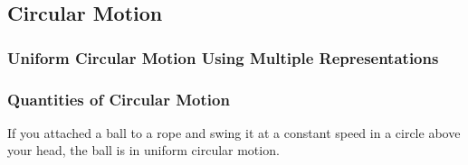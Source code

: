 \documentclass[../main-physics-workbook.tex]{subfiles}
\begin{document}
\clearpage

\subsection{Circular Motion}

\subsubsection{Uniform Circular Motion Using Multiple Representations}

\subsubsection{Quantities of Circular Motion}




\begin{questions}




\question
If you attached a ball to a rope and swing it at a constant speed in a circle above your head, the ball is in uniform circular motion.

\end{questions}
\end{document}
